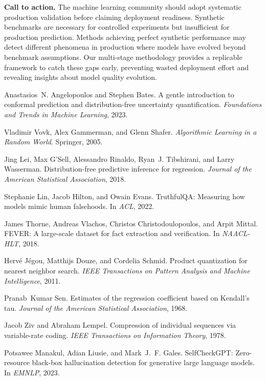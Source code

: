 \documentclass[11pt]{article}
\begin{document}
\textbf{Call to action.} The machine learning community should adopt systematic production validation before claiming deployment readiness. Synthetic benchmarks are necessary for controlled experiments but insufficient for production prediction. Methods achieving perfect synthetic performance may detect different phenomena in production where models have evolved beyond benchmark assumptions. Our multi-stage methodology provides a replicable framework to catch these gaps early, preventing wasted deployment effort and revealing insights about model quality evolution.


\begin{thebibliography}{10}

Anastasios~N. Angelopoulos and Stephen Bates.
\newblock A gentle introduction to conformal prediction and distribution-free uncertainty quantification.
\newblock \emph{Foundations and Trends in Machine Learning}, 2023.

Vladimir Vovk, Alex Gammerman, and Glenn Shafer.
\newblock \emph{Algorithmic Learning in a Random World}.
\newblock Springer, 2005.

Jing Lei, Max G'Sell, Alessandro Rinaldo, Ryan~J. Tibshirani, and Larry Wasserman.
\newblock Distribution-free predictive inference for regression.
\newblock \emph{Journal of the American Statistical Association}, 2018.

Stephanie Lin, Jacob Hilton, and Owain Evans.
\newblock TruthfulQA: Measuring how models mimic human falsehoods.
\newblock In \emph{ACL}, 2022.

James Thorne, Andreas Vlachos, Christos Christodoulopoulos, and Arpit Mittal.
\newblock FEVER: A large-scale dataset for fact extraction and verification.
\newblock In \emph{NAACL-HLT}, 2018.

Herv\'{e} J\'{e}gou, Matthijs Douze, and Cordelia Schmid.
\newblock Product quantization for nearest neighbor search.
\newblock \emph{IEEE Transactions on Pattern Analysis and Machine Intelligence}, 2011.

Pranab~Kumar Sen.
\newblock Estimates of the regression coefficient based on Kendall's tau.
\newblock \emph{Journal of the American Statistical Association}, 1968.

Jacob Ziv and Abraham Lempel.
\newblock Compression of individual sequences via variable-rate coding.
\newblock \emph{IEEE Transactions on Information Theory}, 1978.

Potsawee Manakul, Adian Liusie, and Mark~J.~F. Gales.
\newblock SelfCheckGPT: Zero-resource black-box hallucination detection for generative large language models.
\newblock In \emph{EMNLP}, 2023.

\end{thebibliography}
\end{document}
